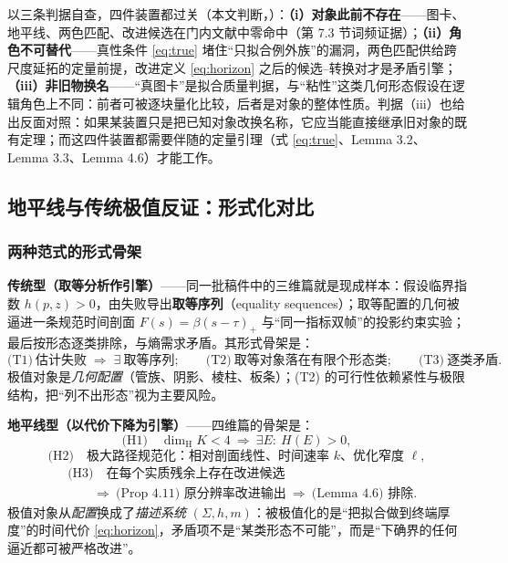\begin{keybox}[为什么这些构成“发明”而非“换名”]
以三条判据自查，四件装置都过关（本文判断，\cfM）：\textbf{（i）对象此前不存在}——图卡、地平线、两色匹配、改进候选在门内文献中零命中（第 7.3 节词频证据）；\textbf{（ii）角色不可替代}——真性条件 \eqref{eq:true} 堵住“只拟合例外族”的漏洞，两色匹配供给跨尺度延拓的定量前提，改进定义 \eqref{eq:horizon} 之后的候选--转换对才是矛盾引擎；\textbf{（iii）非旧物换名}——“真图卡”是拟合质量判据，与“粘性”这类几何形态假设在逻辑角色上不同：前者可被逐块量化比较，后者是对象的整体性质。判据（iii）也给出反面对照：如果某装置只是把已知对象改换名称，它应当能直接继承旧对象的既有定理；而这四件装置都需要伴随的定量引理（式 \eqref{eq:true}、Lemma 3.2、Lemma 3.3、Lemma 4.6）才能工作。
\end{keybox}

\subsection{地平线与传统极值反证：形式化对比}

\subsubsection*{两种范式的形式骨架}

\textbf{传统型（取等分析作引擎）}——同一批稿件中的三维篇就是现成样本：假设临界指数 $h(p,z)>0$，由失败导出\textbf{取等序列}（equality sequences）；取等配置的几何被逼进一条规范时间剖面 $F(s)=\beta(s-\tau)_{+}$ 与“同一指标双帧”的投影约束实验；最后按形态逐类排除，与熵需求矛盾。其形式骨架是：
\begin{equation}
\text{(T1)}\ \text{估计失败}\; \Longrightarrow\; \exists\ \text{取等序列};\qquad
\text{(T2)}\ \text{取等对象落在有限个形态类};\qquad
\text{(T3)}\ \text{逐类矛盾}.
\end{equation}
极值对象是\emph{几何配置}（管族、阴影、棱柱、板条）；(T2) 的可行性依赖紧性与极限结构，把“列不出形态”视为主要风险。

\textbf{地平线型（以代价下降为引擎）}——四维篇的骨架是：
\begin{equation}
\text{(H1)}\quad \dim_{\mathrm{H}}K<4\ \Longrightarrow\ \exists E:\ H(E)>0,
\end{equation}
\begin{equation}
\text{(H2)}\quad \text{极大路径规范化：相对剖面线性、时间速率 } k \text{、优化窄度 } \ell ,
\end{equation}
\begin{equation}
\begin{aligned}
&\text{(H3)}\quad \text{在每个实质残余上存在改进候选}\\
&\qquad\Longrightarrow\ \text{(Prop 4.11) 原分辨率改进输出}\ \Longrightarrow\ \text{(Lemma 4.6) 排除}.
\end{aligned}
\end{equation}
极值对象从\emph{配置}换成了\emph{描述系统} $(\Sigma,h,m)$：被极值化的是“把拟合做到终端厚度”的时间代价 \eqref{eq:horizon}，矛盾项不是“某类形态不可能”，而是“下确界的任何逼近都可被严格改进”。

